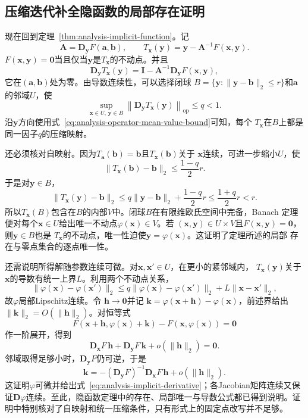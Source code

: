 \subsection{压缩迭代补全隐函数的局部存在证明}

现在回到定理~\ref{thm:analysis-implicit-function}。记
\[   \bm{A}   =   \bm{D}_{\bm{y}}F(\bm{a},\bm{b}),   \qquad   T_{\bm{x}}(\bm{y})   =   \bm{y}-\bm{A}^{-1}F(\bm{x},\bm{y}). \]
$F(\bm{x},\bm{y})=\bm{0}$当且仅当$\bm{y}$是$T_{\bm{x}}$的不动点。并且
\[   \bm{D}_{\bm{y}}T_{\bm{x}}(\bm{y})   =   \bm{I}   -   \bm{A}^{-1}\bm{D}_{\bm{y}}F(\bm{x},\bm{y}), \]
它在$(\bm{a},\bm{b})$处为零。由导数连续性，可以选择闭球 $B=\{\bm{y}:\lVert\bm{y}-\bm{b}\rVert_2\leq r\}$和$\bm{a}$的邻域$U$，使
\begin{equation}
  \sup_{\bm{x}\in U,\,\bm{y}\in B}
  \left\lVert
    \bm{D}_{\bm{y}}T_{\bm{x}}(\bm{y})
  \right\rVert_{\mathrm{op}}
  \leq q<1.
\label{eq:analysis-ift-uniform-contraction}
\end{equation}
沿$\bm{y}$方向使用式~\eqref{eq:analysis-operator-mean-value-bound}可知，每个
$T_{\bm{x}}$在$B$上都是同一因子$q$的压缩映射。

还必须核对自映射。因为$T_{\bm{a}}(\bm{b})=\bm{b}$且$T_{\bm{x}}(\bm{b})$关于 $\bm{x}$连续，可进一步缩小$U$，使
\[   \lVert T_{\bm{x}}(\bm{b})-\bm{b}\rVert_2   \leq\frac{1-q}{2}r. \]
于是对$\bm{y}\in B$，
\[
  \lVert T_{\bm{x}}(\bm{y})-\bm{b}\rVert_2
  \leq
  q\lVert\bm{y}-\bm{b}\rVert_2+\frac{1-q}{2}r
  \leq
  \frac{1+q}{2}r
  <r.
\]
所以$T_{\bm{x}}(B)$包含在$B$的内部$V$中。闭球$B$在有限维欧氏空间中完备，Banach
定理便对每个$\bm{x}\in U$给出唯一不动点$\varphi(\bm{x})\in V$。若
$(\bm{x},\bm{y})\in U\times V$且$F(\bm{x},\bm{y})=\bm{0}$，则$\bm{y}\in B$也是
$T_{\bm{x}}$的不动点，唯一性迫使$\bm{y}=\varphi(\bm{x})$。这证明了定理所述的局部
存在与零点集合的逐点唯一性。

还需说明所得解随参数连续可微。对$\bm{x},\bm{x}'\in U$，在更小的紧邻域内， $T_{\bm{x}}(\bm{y})$关于$\bm{x}$的导数有统一上界$L$。利用两个不动点关系，
\[   \lVert\varphi(\bm{x})-\varphi(\bm{x}')\rVert_2   \leq   q\lVert\varphi(\bm{x})-\varphi(\bm{x}')\rVert_2   +L\lVert\bm{x}-\bm{x}'\rVert_2, \]
故$\varphi$局部Lipschitz连续。令 $\bm{h}\to\bm{0}$并记 $\bm{k}=\varphi(\bm{x}+\bm{h})-\varphi(\bm{x})$，前述界给出 $\lVert\bm{k}\rVert_2=O(\lVert\bm{h}\rVert_2)$。对恒等式
\[   F(\bm{x}+\bm{h},\varphi(\bm{x})+\bm{k})   -   F(\bm{x},\varphi(\bm{x}))   =   \bm{0} \]
作一阶展开，得到
\[   \bm{D}_{\bm{x}}F\,\bm{h}   +   \bm{D}_{\bm{y}}F\,\bm{k}   +   o(\lVert\bm{h}\rVert_2)   =   \bm{0}. \]
邻域取得足够小时，$\bm{D}_{\bm{y}}F$仍可逆，于是
\[   \bm{k}   =   -   (\bm{D}_{\bm{y}}F)^{-1}   \bm{D}_{\bm{x}}F\,\bm{h}   +   o(\lVert\bm{h}\rVert_2). \]
这证明$\varphi$可微并给出式~\eqref{eq:analysis-implicit-derivative}；各Jacobian矩阵连续又保证$\bm{D}\varphi$连续。至此，隐函数定理中的存在、局部唯一与导数公式都已得到说明。证明中特别核对了自映射和统一压缩条件，只有形式上的固定点改写并不足够。
